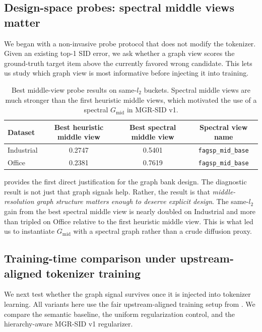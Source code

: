 \subsection{Design-space probes: spectral middle views matter}

We began with a non-invasive probe protocol that does not modify the tokenizer. Given an existing top-1 SID error, we ask whether a graph view scores the ground-truth target item above the currently favored wrong candidate. This lets us study which graph view is most informative before injecting it into training.

\begin{table}[t]
  \centering
  \caption{Best middle-view probe results on same-$l_2$ buckets. Spectral middle views are much stronger than the first heuristic middle views, which motivated the use of a spectral $G_{\mathrm{mid}}$ in MGR-SID v1.}
  \label{tab:probe}
  \begin{tabular}{lccc}
    \toprule
    Dataset & Best heuristic middle view & Best spectral middle view & Spectral view name \\
    \midrule
    Industrial & 0.2747 & 0.5401 & \texttt{fagsp\_mid\_base} \\
    Office & 0.2381 & 0.7619 & \texttt{fagsp\_mid\_base} \\
    \bottomrule
  \end{tabular}
\end{table}

 provides the first direct justification for the graph bank design. The diagnostic result is not just that graph signals help. Rather, the result is that \emph{middle-resolution graph structure matters enough to deserve explicit design}. The same-$l_2$ gain from the best spectral middle view is nearly doubled on Industrial and more than tripled on Office relative to the first heuristic middle view. This is what led us to instantiate $G_{\mathrm{mid}}$ with a spectral graph rather than a crude diffusion proxy.

\subsection{Training-time comparison under upstream-aligned tokenizer training}

We next test whether the graph signal survives once it is injected into tokenizer learning. All variants here use the fair upstream-aligned training setup from . We compare the semantic baseline, the uniform regularization control, and the hierarchy-aware MGR-SID v1 regularizer.

